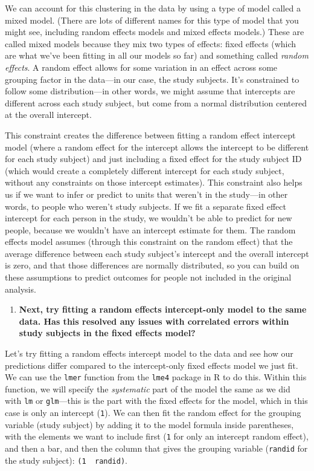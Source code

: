 \documentclass[
]{book}
\providecommand{\tightlist}{%
  \setlength{\itemsep}{0pt}\setlength{\parskip}{0pt}}
\begin{document}
We can account for this clustering in the data by using a type of model called a
mixed model. (There are lots of different names for this type of model that you
might see, including random effects models and mixed effects models.) These are
called mixed models because they mix two types of effects: fixed effects (which
are what we've been fitting in all our models so far) and something called
\emph{random effects}. A random effect allows for some variation in an effect across
some grouping factor in the data---in our case, the study subjects. It's
constrained to follow some distribution---in other words, we might assume that
intercepts are different across each study subject, but come from a normal
distribution centered at the overall intercept.

This constraint creates the difference between fitting a random effect intercept
model (where a random effect for the intercept allows the intercept to be
different for each study subject) and just including a fixed effect for the
study subject ID (which would create a completely different intercept for each
study subject, without any constraints on those intercept estimates). This
constraint also helps us if we want to infer or predict to units that weren't in
the study---in other words, to people who weren't study subjects. If we fit a
separate fixed effect intercept for each person in the study, we wouldn't be
able to predict for new people, because we wouldn't have an intercept estimate
for them. The random effects model assumes (through this constraint on the
random effect) that the average difference between each study subject's
intercept and the overall intercept is zero, and that those differences are
normally distributed, so you can build on these assumptions to predict outcomes
for people not included in the original analysis.

\begin{enumerate}
\def\labelenumi{\arabic{enumi}.}
\setcounter{enumi}{1}
\tightlist
\item
  \textbf{Next, try fitting a random effects intercept-only model to the same data. Has this resolved any issues with correlated errors within study subjects in the fixed effects model?}
\end{enumerate}

Let's try fitting a random effects intercept model to the data and see how our
predictions differ compared to the intercept-only fixed effects model we just fit.
We can use the \texttt{lmer} function from the \texttt{lme4} package in R to do this. Within
this function, we will specify the \emph{systematic} part of the model the same as
we did with \texttt{lm} or \texttt{glm}---this is the part with the fixed effects for the model,
which in this case is only an intercept (\texttt{1}). We can then fit the random
effect for the grouping variable (study subject) by adding it to the model formula
inside parentheses, with the elements we want to include first (\texttt{1} for only
an intercept random effect), and then a bar, and then the column that gives
the grouping variable (\texttt{randid} for the study subject): \texttt{(1\ \textbar{}\ randid)}.
\end{document}
